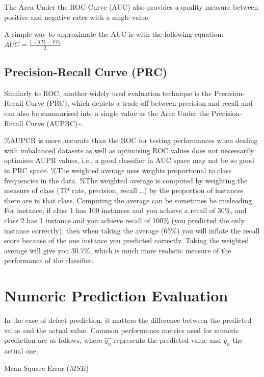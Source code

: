 \documentclass[
]{book}
\begin{document}
The Area Under the ROC Curve (AUC) also provides a quality measure between positive and negative rates with a single value.

A simple way to approximate the AUC is with the following equation:
\(AUC=\frac{1+TP_{r}-FP_{r}}{2}\)

\hypertarget{precision-recall-curve-prc}{%
\subsection{Precision-Recall Curve (PRC)}\label{precision-recall-curve-prc}}

Similarly to ROC, another widely used evaluation technique is the Precision-Recall Curve (PRC), which depicts a trade off between precision and recall and can also be summarised into a single value as the Area Under the Precision-Recall Curve (AUPRC)\textasciitilde{}\cite{Davis2006}.

\%AUPCR is more accurate than the ROC for testing performances when dealing with imbalanced datasets as well as optimising ROC values does not necessarily optimises AUPR values, i.e., a good classifier in AUC space may not be so good in PRC space.
\%The weighted average uses weights proportional to class frequencies in the data.
\%The weighted average is computed by weighting the measure of class (TP rate, precision, recall \ldots) by the proportion of instances there are in that class. Computing the average can be sometimes be misleading. For instance, if class 1 has 100 instances and you achieve a recall of 30\%, and class 2 has 1 instance and you achieve recall of 100\% (you predicted the only instance correctly), then when taking the average (65\%) you will inflate the recall score because of the one instance you predicted correctly. Taking the weighted average will give you 30.7\%, which is much more realistic measure of the performance of the classifier.

\hypertarget{numeric-prediction-evaluation}{%
\section{Numeric Prediction Evaluation}\label{numeric-prediction-evaluation}}

In the case of defect prediction, it matters the difference between the predicted value and the actual value. Common performance metrics used for numeric prediction are as follows, where \(\hat{y_n}\) represents the predicted value and \(y_n\) the actual one.

Mean Square Error (\(MSE\))
\end{document}
